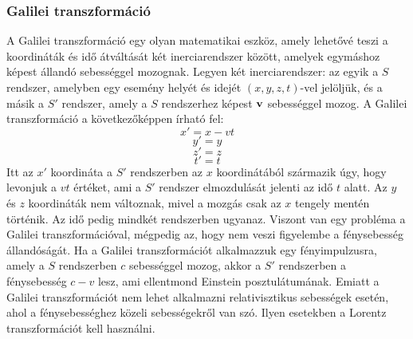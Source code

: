 \documentclass[a4paper,12pt]{article}
\begin{document}
\subsubsection{Galilei transzformáció}
    A Galilei transzformáció egy olyan matematikai eszköz, amely lehetővé teszi a koordináták és idő átváltását két inerciarendszer között, amelyek egymáshoz képest állandó sebességgel mozognak.
    Legyen két inerciarendszer: az egyik a $S$ rendszer, amelyben egy esemény helyét és idejét $(x, y, z, t)$-vel jelöljük, és a másik a $S'$ rendszer, amely a $S$ rendszerhez képest $\bold{v}$ sebességgel mozog.
    A Galilei transzformáció a következőképpen írható fel:
    \begin{equation}
        x' = x - vt
    \end{equation}
    \begin{equation}
        y' = y
    \end{equation}
    \begin{equation}
        z' = z
    \end{equation}
    \begin{equation}
        t' = t
    \end{equation}
    Itt az $x'$ koordináta a $S'$ rendszerben az $x$ koordinátából származik úgy, hogy levonjuk a $vt$ értéket, ami a $S'$ rendszer elmozdulását jelenti az idő $t$ alatt. Az $y$ és $z$ koordináták nem változnak,
    mivel a mozgás csak az $x$ tengely mentén történik. Az idő pedig mindkét rendszerben ugyanaz. Viszont van egy probléma a Galilei transzformációval, mégpedig az, hogy nem veszi figyelembe a fénysebesség állandóságát.
    Ha a Galilei transzformációt alkalmazzuk egy fényimpulzusra, amely a $S$ rendszerben $c$ sebességgel mozog, akkor a $S'$ rendszerben a fénysebesség $c - v$ lesz, ami ellentmond Einstein posztulátumának.
    Emiatt a Galilei transzformációt nem lehet alkalmazni relativisztikus sebességek esetén, ahol a fénysebességhez közeli sebességekről van szó. Ilyen esetekben a Lorentz transzformációt kell használni.
\end{document}
